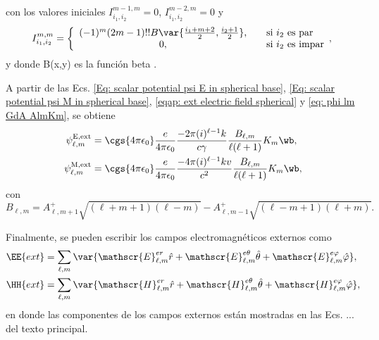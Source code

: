 con los valores iniciales $I_{i_1,i_2}^{m-1,m}=0$, $I_{i_1,i_2}^{m-2,m}=0$ y
\begin{equation}
I_{i_1,i_2}^{m,m} = 
\left\{ 
  \begin{array}{ c l }
    (-1)^m (2m-1)!! B\var{\frac{i_1 + m +2}{2}, \frac{i_2+1}{2}}, & \quad \textrm{si } i_2 \textrm{ es par} \\
    0,                 & \quad \textrm{si } i_2 \textrm{ es impar}
  \end{array},
\right.
\end{equation}
y donde B(x,y) es la función beta \citep{Abramowitz}.

A partir de las Ecs. \eqref{Eq: scalar potential psi E in spherical base}, \eqref{Eq: scalar potential psi M in spherical base}, \eqref{eqap: ext electric field spherical} y \eqref{eq: phi lm GdA AlmKm}, se obtiene 
\begin{align}
\psi_{\ell, m}^{\rm E, ext} &= \cgs{4\pi\epsilon_0}\frac{e}{4\pi\epsilon_0}\frac{-2\pi(i)^{\ell-1}k}{c \gamma}\frac{B_{\ell,m}}{\ell(\ell+1)}K_m\wb, \\
\psi_{\ell, m}^{\rm M, ext} &= \cgs{4\pi\epsilon_0}\frac{e}{4\pi\epsilon_0}\frac{-4\pi(i)^{\ell-1}k v}{c^2}\frac{B_{\ell,m}}{\ell(\ell+1)}K_m\wb,
\end{align}
con
\begin{equation}
B_{\ell, m} = A_{\ell,m+1}^{+}\sqrt{(\ell + m+1)(\ell-m)}-A_{\ell,m-1}^{+}\sqrt{(\ell - m+1)(\ell+m)}.
\end{equation}

Finalmente, se pueden escribir los campos electromagnéticos externos como 
\begin{align}
\EE{ext} &= \sum_{\ell,m}\var{\mathscr{E}_{\ell, m}^{er}\hat{r} + \mathscr{E}_{\ell, m}^{e\theta}\hat{\theta}+\mathscr{E}_{\ell, m}^{e\varphi}\hat{\varphi}},\\
\HH{ext} &= \sum_{\ell,m}\var{\mathscr{H}_{\ell, m}^{er}\hat{r} + \mathscr{H}_{\ell, m}^{e\theta}\hat{\theta}+\mathscr{H}_{\ell, m}^{e\varphi}\hat{\varphi}},
\end{align}
en donde las componentes de los campos externos están mostradas en las Ecs. ... del texto principal.
